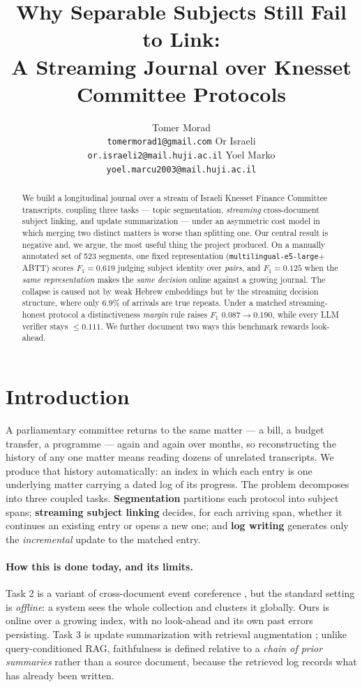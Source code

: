 \documentclass[11pt]{article}
\title{Why Separable Subjects Still Fail to Link:\\
A Streaming Journal over Knesset Committee Protocols}
\author{Tomer Morad \\ \texttt{tomermorad1@gmail.com} \And
  Or Israeli \\ \texttt{or.israeli2@mail.huji.ac.il} \And
  Yoel Marko \\ \texttt{yoel.marcu2003@mail.huji.ac.il}}
\begin{document}
\maketitle

\begin{abstract}
We build a longitudinal journal over a stream of Israeli Knesset Finance Committee
transcripts, coupling three tasks --- topic segmentation, \emph{streaming} cross-document
subject linking, and update summarization --- under an asymmetric cost model in which merging
two distinct matters is worse than splitting one. Our central result is negative and, we
argue, the most useful thing the project produced. On a manually annotated set of 523
segments, one fixed representation (\texttt{multilingual-e5-large}$+$ABTT) scores
$F_1{=}0.619$ judging subject identity over \emph{pairs}, and $F_1{=}0.125$ when the
\emph{same representation} makes the \emph{same decision} online against a growing journal.
The collapse is caused not by weak Hebrew embeddings but by the streaming decision structure,
where only $6.9\%$ of arrivals are true repeats. Under a matched streaming-honest protocol a
distinctiveness \emph{margin} rule raises $F_1$ $0.087{\to}0.190$, while every LLM verifier
stays $\le 0.111$. We further document two ways this benchmark rewards look-ahead.
\end{abstract}

\section{Introduction}

A parliamentary committee returns to the same matter --- a bill, a budget transfer, a
programme --- again and again over months, so reconstructing the history of any one matter
means reading dozens of unrelated transcripts. We produce that history automatically: an
index in which each entry is one underlying matter carrying a dated log of its progress.
The problem decomposes into three coupled tasks. \textbf{Segmentation} partitions each
protocol into subject spans; \textbf{streaming subject linking} decides, for each arriving
span, whether it continues an existing entry or opens a new one; and \textbf{log writing}
generates only the \emph{incremental} update to the matched entry.

\paragraph{How this is done today, and its limits.}
Task 2 is a variant of cross-document event coreference
\cite{cybulska2014sledgehammer,barhom2019revisiting}, but the standard setting is
\emph{offline}: a system sees the whole collection and clusters it globally. Ours is online
over a growing index, with no look-ahead and its own past errors persisting. Task 3 is
update summarization \cite{dang2008update} with retrieval augmentation \cite{lewis2020rag};
unlike query-conditioned RAG, faithfulness is defined relative to a \emph{chain of prior
summaries} rather than a source document, because the retrieved log records what has already
been written.
\end{document}
